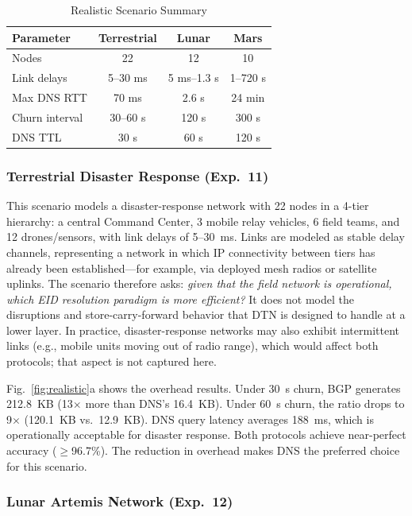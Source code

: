 \documentclass[journal,twocolumn]{IEEEtran}
\begin{document}
\begin{table}[t]
\centering
\caption{Realistic Scenario Summary}
\label{tab:scenario_summary}
\begin{tabular}{@{}lccc@{}}
\toprule
\textbf{Parameter} & \textbf{Terrestrial} & \textbf{Lunar} & \textbf{Mars} \\
\midrule
Nodes & 22 & 12 & 10 \\
Link delays & 5--30 ms & 5 ms--1.3 s & 1--720 s \\
Max DNS RTT & 70 ms & 2.6 s & 24 min \\
Churn interval & 30--60 s & 120 s & 300 s \\
DNS TTL & 30 s & 60 s & 120 s \\
\bottomrule
\end{tabular}
\end{table}

\subsubsection{Terrestrial Disaster Response (Exp.~11)}

This scenario models a disaster-response network with 22 nodes in a 4-tier hierarchy: a central Command Center, 3 mobile relay vehicles, 6 field teams, and 12 drones/sensors, with link delays of 5--30~ms.
Links are modeled as stable delay channels, representing a network in which IP connectivity between tiers has already been established---for example, via deployed mesh radios or satellite uplinks.
The scenario therefore asks: \emph{given that the field network is operational, which EID resolution paradigm is more efficient?} It does not model the disruptions and store-carry-forward behavior that DTN is designed to handle at a lower layer.
In practice, disaster-response networks may also exhibit intermittent links (e.g., mobile units moving out of radio range), which would affect both protocols; that aspect is not captured here.

Fig.~\ref{fig:realistic}a shows the overhead results. 
Under 30~s churn, BGP generates 212.8~KB (13$\times$ more than DNS's 16.4~KB). 
Under 60~s churn, the ratio drops to 9$\times$ (120.1~KB vs.\ 12.9~KB). 
DNS query latency averages 188~ms, which is operationally acceptable for disaster response. 
Both protocols achieve near-perfect accuracy ($\geq$96.7\%). 
The reduction in overhead makes DNS the preferred choice for this scenario.

\subsubsection{Lunar Artemis Network (Exp.~12)}
\end{document}
